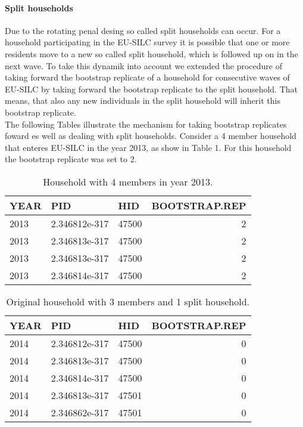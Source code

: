 \documentclass{scrartcl}\usepackage[]{graphicx}\usepackage[]{color}
\begin{document}
\paragraph{Split households}
Due to the rotating penal desing so called split households can occur. For a household participating in the EU-SILC survey it is possible that one or more residents move to a new so called split household, which is followed up on in the next wave. To take this dynamik into account we extended the procedure of taking forward the bootstrap replicate of a household for consecutive waves of EU-SILC by taking forward the bootstrap replicate to the split household. That means, that also any new individuals in the split household will inherit this bootstrap replicate.\\
\newline
The following Tables illustrate the mechanism for taking bootstrap replicates foward es well as dealing with split households.
Consider a 4 member household that enteres EU-SILC in the year 2013, as show in Table 1. For this household the bootstrap replicate was set to 2.



\begin{table}

\caption{\label{tab:unnamed-chunk-2}Household with 4 members in year 2013.}
\centering
\begin{tabular}[t]{lllr}
\toprule
YEAR & PID & HID & BOOTSTRAP.REP\\
\midrule
2013 & 2.346812e-317 & 47500 & 2\\
2013 & 2.346813e-317 & 47500 & 2\\
2013 & 2.346813e-317 & 47500 & 2\\
2013 & 2.346814e-317 & 47500 & 2\\
\bottomrule
\end{tabular}
\end{table}



\begin{table}

\caption{\label{tab:unnamed-chunk-3}Original household with 3 members and 1 split household.}
\centering
\begin{tabular}[t]{lllr}
\toprule
YEAR & PID & HID & BOOTSTRAP.REP\\
\midrule
2014 & 2.346812e-317 & 47500 & 0\\
2014 & 2.346813e-317 & 47500 & 0\\
2014 & 2.346814e-317 & 47500 & 0\\
2014 & 2.346813e-317 & 47501 & 0\\
2014 & 2.346862e-317 & 47501 & 0\\
\bottomrule
\end{tabular}
\end{table}
\end{document}

